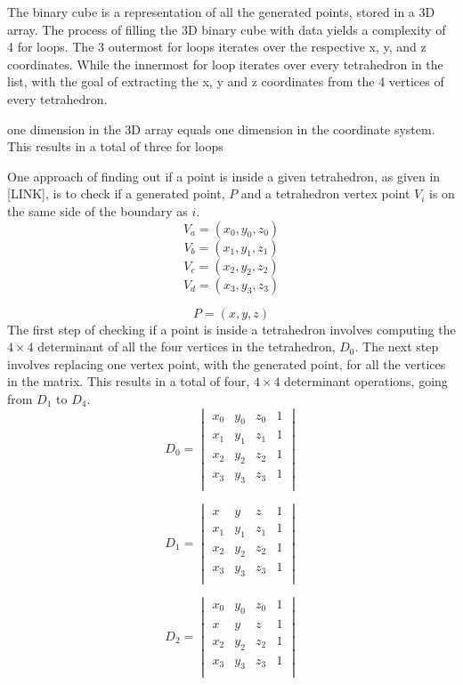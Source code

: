 The binary cube is a representation of all the generated points, stored in a 3D array. The process of filling the 3D binary cube with data yields a complexity of 4 for loops. The 3 outermost for loops iterates over the respective x, y, and z coordinates. While the innermost for loop iterates over every tetrahedron in the list, with the goal of extracting the x, y and z coordinates from the 4 vertices of every tetrahedron.

one dimension in the 3D array equals one dimension in the coordinate system. This results in a total of three for loops

One approach of finding out if a point is inside a given tetrahedron, as given in [LINK], is to check if a generated point, \(P\) and a tetrahedron vertex point \( V_{i}\) is on the same side of the boundary as \( i\). 
\[
V_{a} = (x_{0}, y_{0}, z_{0}) 
\]
\[
V_{b} = (x_{1}, y_{1}, z_{1})
\]
\[
V_{c} = (x_{2}, y_{2}, z_{2})
\]
\[
V_{d} = (x_{3}, y_{3}, z_{3})
\]

\[
P = (x, y, z)
\]
The first step of checking if a point is inside a tetrahedron involves computing the \(4 \times 4\) determinant of all the four vertices in the tetrahedron,  \(D_{0}\). The next step involves replacing one vertex point, with the generated point, for all the vertices in the matrix. This results in a total of four, \(4 \times 4\) determinant operations, going from \(D_{1}\) to \(D_{4}\). 
\[
D_{0} =
\begin{vmatrix}
x_{0} & y_{0} & z_{0} & 1 \\ 
x_{1} & y_{1} & z_{1} & 1 \\ 
x_{2} & y_{2} & z_{2} & 1 \\ 
x_{3} & y_{3} & z_{3} & 1 \\ 
\end{vmatrix}
\]

\[
D_{1} =
\begin{vmatrix}
x & y & z & 1 \\ 
x_{1} & y_{1} & z_{1} & 1 \\ 
x_{2} & y_{2} & z_{2} & 1 \\ 
x_{3} & y_{3} & z_{3} & 1 \\ 
\end{vmatrix}
\]

\[
D_{2} =
\begin{vmatrix}
x_{0} & y_{0} & z_{0} & 1 \\ 
x & y & z & 1 \\ 
x_{2} & y_{2} & z_{2} & 1 \\ 
x_{3} & y_{3} & z_{3} & 1 \\ 
\end{vmatrix}
\]

